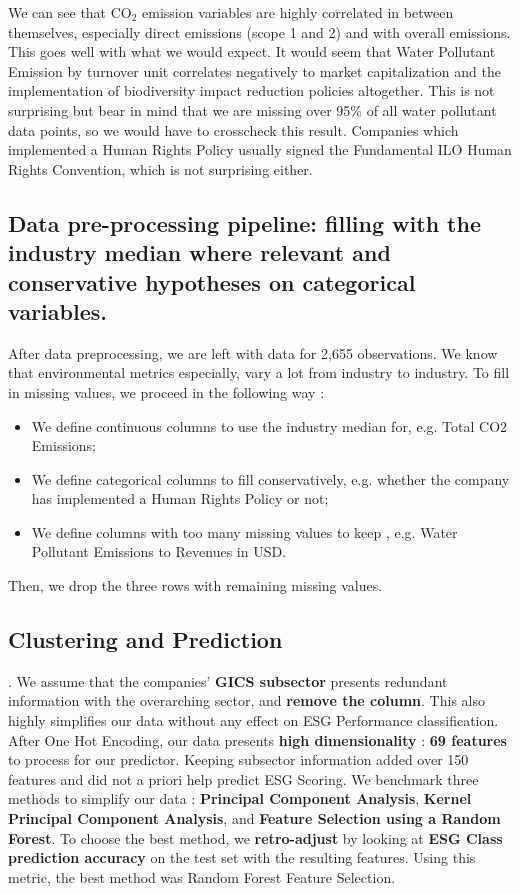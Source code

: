 \documentclass[12pt]{report}
\begin{document}
We can see that CO$_{2}$ emission variables are highly correlated in between themselves, especially direct emissions (scope 1 and 2) and with overall emissions. This goes well with what we would expect. 
It would seem that Water Pollutant Emission by turnover unit correlates negatively to market capitalization and the implementation of biodiversity impact reduction policies altogether. This is not surprising but bear in mind that we are missing over 95\% of all water pollutant data points, so we would have to crosscheck this result. 
Companies which implemented a Human Rights Policy usually signed the Fundamental ILO Human Rights Convention, which is not surprising either.

\subsection{Data pre-processing pipeline: filling with the industry median where relevant and conservative hypotheses on categorical variables.}

After data preprocessing, we are left with data for 2,655 observations.\newline
We know that environmental metrics especially, vary a lot from industry to industry.
To fill in missing values, we proceed in the following way :
\begin{itemize}
    \item We define continuous columns to use the industry median for, e.g. Total CO2 Emissions;
    \item We define categorical columns to fill conservatively, e.g. whether the company has implemented a Human Rights Policy or not;
    \item We define columns with too many missing values to keep , e.g. Water Pollutant Emissions to Revenues in USD.
\end{itemize}
Then, we drop the three rows with remaining missing values. 

\subsection{Clustering and Prediction}. 
We assume that the companies' \textbf{GICS subsector} presents redundant information with the overarching sector, and \textbf{remove the column}. This also highly simplifies our data without any effect on ESG Performance classification.\newline 
After One Hot Encoding, our data presents \textbf{high dimensionality} : \textbf{69 features} to process for our predictor. Keeping subsector information added over 150 features and did not a priori help predict ESG Scoring.\newline
We benchmark three methods to simplify our data : \textbf{Principal Component Analysis}, \textbf{Kernel Principal Component Analysis}, and \textbf{Feature Selection using a Random Forest}. To choose the best method, we \textbf{retro-adjust} by looking at \textbf{ESG Class prediction accuracy} on the test set with the resulting features. Using this metric, the best method was Random Forest Feature Selection. 
\end{document}
